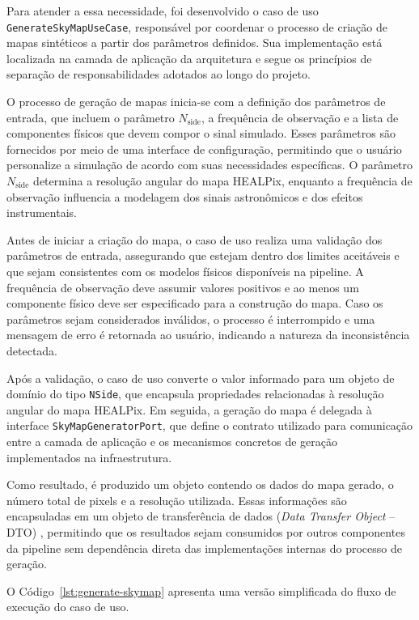 Para atender a essa necessidade, foi desenvolvido o caso de uso \texttt{GenerateSkyMapUseCase}, responsável por coordenar o processo de criação de mapas sintéticos a partir dos parâmetros definidos. Sua implementação está localizada na camada de aplicação da arquitetura e segue os princípios de separação de responsabilidades adotados ao longo do projeto.

O processo de geração de mapas inicia-se com a definição dos parâmetros de entrada, que incluem o parâmetro $N_{\mathrm{side}}$, a frequência de observação e a lista de componentes físicos que devem compor o sinal simulado. Esses parâmetros são fornecidos por meio de uma interface de configuração, permitindo que o usuário personalize a simulação de acordo com suas necessidades específicas. O parâmetro $N_{\mathrm{side}}$ determina a resolução angular do mapa HEALPix, enquanto a frequência de observação influencia a modelagem dos sinais astronômicos e dos efeitos instrumentais.

Antes de iniciar a criação do mapa, o caso de uso realiza uma validação dos parâmetros de entrada, assegurando que estejam dentro dos limites aceitáveis e que sejam consistentes com os modelos físicos disponíveis na pipeline. A frequência de observação deve assumir valores positivos e ao menos um componente físico deve ser especificado para a construção do mapa. Caso os parâmetros sejam considerados inválidos, o processo é interrompido e uma mensagem de erro é retornada ao usuário, indicando a natureza da inconsistência detectada.

Após a validação, o caso de uso converte o valor informado para um objeto de domínio do tipo \texttt{NSide}, que encapsula propriedades relacionadas à resolução angular do mapa HEALPix. Em seguida, a geração do mapa é delegada à interface \texttt{SkyMapGeneratorPort}, que define o contrato utilizado para comunicação entre a camada de aplicação e os mecanismos concretos de geração implementados na infraestrutura.

Como resultado, é produzido um objeto contendo os dados do mapa gerado, o número total de pixels e a resolução utilizada. Essas informações são encapsuladas em um objeto de transferência de dados (\textit{Data Transfer Object} -- DTO) \cite{evans2003ddd}, permitindo que os resultados sejam consumidos por outros componentes da pipeline sem dependência direta das implementações internas do processo de geração.

O Código~\ref{lst:generate-skymap} apresenta uma versão simplificada do fluxo de execução do caso de uso.

